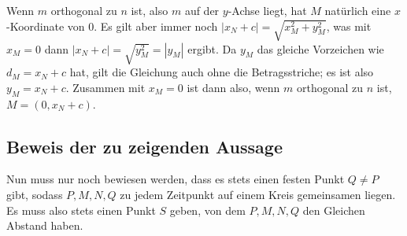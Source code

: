 Wenn $m$ orthogonal zu $n$ ist, also $m$ auf der $y$-Achse liegt, hat $M$ natürlich eine $x$-Koordinate von 0. 
Es gilt aber immer noch $|x_N+c|=\sqrt{x_M^2+y_M^2}$, was mit $x_M=0$ dann $|x_N+c|=\sqrt{y_M^2}=|y_M|$ ergibt. Da 
$y_M$ das gleiche Vorzeichen wie $d_M=x_N+c$ hat, gilt die Gleichung auch ohne die Betragsstriche; es ist also $y_M
=x_N+c$. Zusammen mit $x_M=0$ ist dann also, wenn $m$ orthogonal zu $n$ ist, $M=(0, x_N+c)$.

\subsection*{Beweis der zu zeigenden Aussage}

Nun muss nur noch bewiesen werden, dass es stets einen festen Punkt $Q\neq P$ gibt, sodass $P, M, N, Q$ zu jedem 
Zeitpunkt auf einem Kreis gemeinsamen liegen. Es muss also stets einen Punkt $S$ geben, von dem $P, M, N, Q$ den 
Gleichen Abstand haben.

